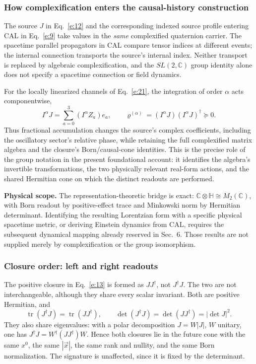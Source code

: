 \documentclass[10pt]{article}
\newcommand{\tr}{\operatorname{tr}}
\begin{document}
\subsubsection{How complexification enters the causal-history construction}

The source $J$ in Eq.~\eqref{e:12} and the corresponding indexed source profile entering CAL in Eq.~\eqref{e:9} take values in the \emph{same} complexified quaternion carrier. The spacetime parallel propagators in CAL compare tensor indices at different events; the internal connection transports the source's internal index. Neither transport is replaced by algebraic complexification, and the $SL(2,\mathbb C)$ group identity alone does not specify a spacetime connection or field dynamics.

For the locally linearized channels of Eq.~\eqref{e:21}, the integration of order $\alpha$ acts componentwise,
\begin{equation}
I^\alpha J=\sum_{a=0}^{3}(I^\alpha Z_a)e_a,\qquad \varrho^{(\alpha)}=(I^\alpha J)(I^\alpha J)^\dagger\succeq0.\label{e:42}
\end{equation}
Thus fractional accumulation changes the source's complex coefficients, including the oscillatory sector's relative phase, while retaining the full complexified matrix algebra and the closure's Born/causal-cone identities. This is the precise role of the group notation in the present foundational account: it identifies the algebra's invertible transformations, the two physically relevant real-form actions, and the shared Hermitian cone on which the distinct readouts are performed.

\medskip
\noindent\textbf{Physical scope.} The representation-theoretic bridge is exact: $\mathbb C\otimes\mathbb H\cong M_2(\mathbb C)$, with Born readout by positive-effect trace and Minkowski norm by Hermitian determinant. Identifying the resulting Lorentzian form with a specific physical spacetime metric, or deriving Einstein dynamics from CAL, requires the subsequent dynamical mapping already reserved in Sec.~6. Those results are not supplied merely by complexification or the group isomorphism.

\subsubsection{Closure order: left and right readouts}

The positive closure in Eq.~\eqref{e:13} is formed as $JJ^\dagger$, not $J^\dagger J$. The two are not interchangeable, although they share every scalar invariant. Both are positive Hermitian, and
\begin{equation}
\tr(J^\dagger J)=\tr(JJ^\dagger),\qquad \det(J^\dagger J)=\det(JJ^\dagger)=|\det J|^2.\label{e:43}
\end{equation}
They also share eigenvalues: with a polar decomposition $J=W|J|$, $W$ unitary, one has $J^\dagger J=W^\dagger(JJ^\dagger)W$. Hence both closures lie in the future cone with the same $x^0$, the same $|\vec x|$, the same rank and nullity, and the same Born normalization. The signature is unaffected, since it is fixed by the determinant.
\end{document}
